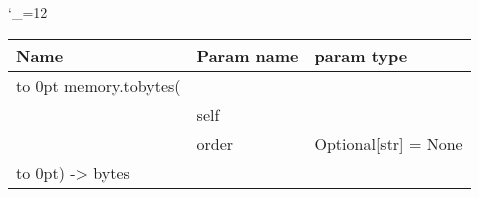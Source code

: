 \begingroup \catcode`\_=12 \tt
\begin{tabular}{lll}
\toprule
\textrm{Name}&\textrm{Param name}&\textrm{param type}\\
\midrule
\hbox to 0pt {memory.tobytes(\hss}\\
& self\\
& order & Optional[str] = None\\
\hbox to 0pt{) -> bytes\hss}\\
\bottomrule
\end{tabular}
\endgroup
